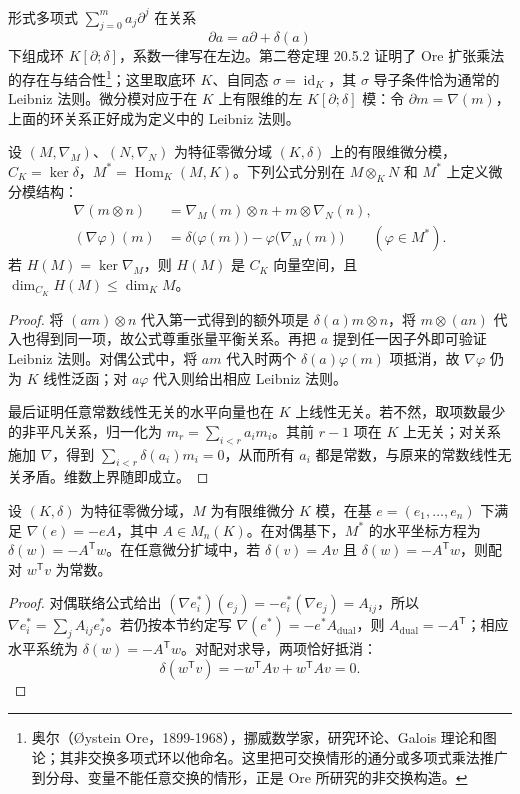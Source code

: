 形式多项式 \(\sum_{j=0}^m a_j\partial^j\) 在关系
\[
	\partial a=a\partial+\delta(a)
\]
下组成环 \(K[\partial;\delta]\)，系数一律写在左边。第二卷定理 20.5.2 证明了 Ore 扩张乘法的存在与结合性\footnote{奥尔（Øystein Ore，1899-1968），挪威数学家，研究环论、Galois 理论和图论；其非交换多项式环以他命名。这里把可交换情形的通分或多项式乘法推广到分母、变量不能任意交换的情形，正是 Ore 所研究的非交换构造。}；这里取底环 \(K\)、自同态 \(\sigma=\operatorname{id}_K\)，其 \(\sigma\) 导子条件恰为通常的 Leibniz 法则。微分模对应于在 \(K\) 上有限维的左 \(K[\partial;\delta]\) 模：令 \(\partial m=\nabla(m)\)，上面的环关系正好成为定义中的 Leibniz 法则。

\begin{proposition}\label{b5:prop:E-tensor-horizontal}
	设 \((M,\nabla_M)\)、\((N,\nabla_N)\) 为特征零微分域 \((K,\delta)\) 上的有限维微分模，\(C_K=\ker\delta\)，\(M^*=\operatorname{Hom}_K(M,K)\)。下列公式分别在 \(M\otimes_KN\) 和 \(M^*\) 上定义微分模结构：
	\[
		\begin{aligned}
			\nabla(m\otimes n)&=\nabla_M(m)\otimes n+m\otimes\nabla_N(n),\\
			(\nabla\varphi)(m)&=\delta\bigl(\varphi(m)\bigr)-\varphi\bigl(\nabla_M(m)\bigr) \qquad(\varphi\in M^*).
		\end{aligned}
	\]
	若 \(H(M)=\ker\nabla_M\)，则 \(H(M)\) 是 \(C_K\) 向量空间，且 \(\dim_{C_K}H(M)\le\dim_KM\)。
\end{proposition}
\begin{proof}
	将 \((am)\otimes n\) 代入第一式得到的额外项是 \(\delta(a)m\otimes n\)，将 \(m\otimes(an)\) 代入也得到同一项，故公式尊重张量平衡关系。再把 \(a\) 提到任一因子外即可验证 Leibniz 法则。对偶公式中，将 \(am\) 代入时两个 \(\delta(a)\varphi(m)\) 项抵消，故 \(\nabla\varphi\) 仍为 \(K\) 线性泛函；对 \(a\varphi\) 代入则给出相应 Leibniz 法则。

	最后证明任意常数线性无关的水平向量也在 \(K\) 上线性无关。若不然，取项数最少的非平凡关系，归一化为 \(m_r=\sum_{i<r}a_i m_i\)。其前 \(r-1\) 项在 \(K\) 上无关；对关系施加 \(\nabla\)，得到 \(\sum_{i<r}\delta(a_i)m_i=0\)，从而所有 \(a_i\) 都是常数，与原来的常数线性无关矛盾。维数上界随即成立。
\end{proof}

\begin{proposition}\label{b5:prop:E-dual-system}
	设 \((K,\delta)\) 为特征零微分域，\(M\) 为有限维微分 \(K\) 模，在基 \(e=(e_1,\ldots,e_n)\) 下满足 \(\nabla(e)=-eA\)，其中 \(A\in M_n(K)\)。在对偶基下，\(M^*\) 的水平坐标方程为 \(\delta(w)=-A^{\mathsf T}w\)。在任意微分扩域中，若 \(\delta(v)=Av\) 且 \(\delta(w)=-A^{\mathsf T}w\)，则配对 \(w^{\mathsf T}v\) 为常数。
\end{proposition}
\begin{proof}
	对偶联络公式给出 \((\nabla e_i^*)(e_j)=-e_i^*(\nabla e_j)=A_{ij}\)，所以 \(\nabla e_i^*=\sum_jA_{ij}e_j^*\)。若仍按本节约定写 \(\nabla(e^*)=-e^*A_{\mathrm{dual}}\)，则 \(A_{\mathrm{dual}}=-A^{\mathsf T}\)；相应水平系统为 \(\delta(w)=-A^{\mathsf T}w\)。对配对求导，两项恰好抵消：
	\[
		\delta(w^{\mathsf T}v)=-w^{\mathsf T}Av+w^{\mathsf T}Av=0.
	\]
\end{proof}

